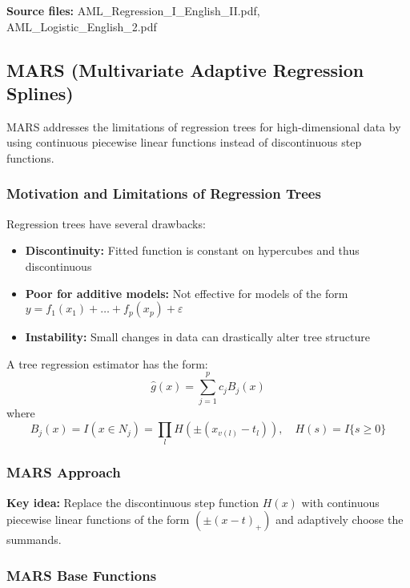 \documentclass[12pt,a4paper]{article}
\begin{document}
\textbf{Source files:} AML\_Regression\_I\_English\_II.pdf, AML\_Logistic\_English\_2.pdf

\subsection{MARS (Multivariate Adaptive Regression Splines)}

MARS addresses the limitations of regression trees for high-dimensional data by using continuous piecewise linear functions instead of discontinuous step functions.

\subsubsection{Motivation and Limitations of Regression Trees}

Regression trees have several drawbacks:
\begin{itemize}
    \item \textbf{Discontinuity:} Fitted function is constant on hypercubes and thus discontinuous
    \item \textbf{Poor for additive models:} Not effective for models of the form $y = f_1(x_1) + \ldots + f_p(x_p) + \varepsilon$
    \item \textbf{Instability:} Small changes in data can drastically alter tree structure
\end{itemize}

A tree regression estimator has the form:
\begin{equation}
\hat{g}(x) = \sum_{j=1}^p c_j B_j(x)
\end{equation}
where
\begin{equation}
B_j(x) = I(x \in N_j) = \prod_l H(\pm(x_{v(l)} - t_l)), \quad H(s) = I\{s \geq 0\}
\end{equation}

\subsubsection{MARS Approach}

\textbf{Key idea:} Replace the discontinuous step function $H(x)$ with continuous piecewise linear functions of the form $(\pm(x - t)_+)$ and adaptively choose the summands.

\subsubsection{MARS Base Functions}
\end{document}
